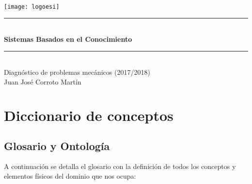 \documentclass[a4paper,12pt]{article}
\begin{document}
\begin{titlepage}
\begin{center}

\texttt{[image: logoesi]}\\[5cm]

\rule{\linewidth}{0.5mm} \\[0.4cm]
{ \huge \bfseries Sistemas Basados en el Conocimiento\\[0.4cm] }
\rule{\linewidth}{0.5mm} \\[1.5cm]
{\huge Diagnóstico de problemas mecánicos (2017/2018)}\\[0.5cm]

\large{Juan Jos\'e Corroto Mart\'in}

\end{center}
\end{titlepage}

\tableofcontents
\newpage

\section{Diccionario de conceptos}
\subsection{Glosario y Ontología}
A continuación se detalla el glosario con la definición de todos los conceptos y elementos físicos del dominio que nos ocupa:
\end{document}
